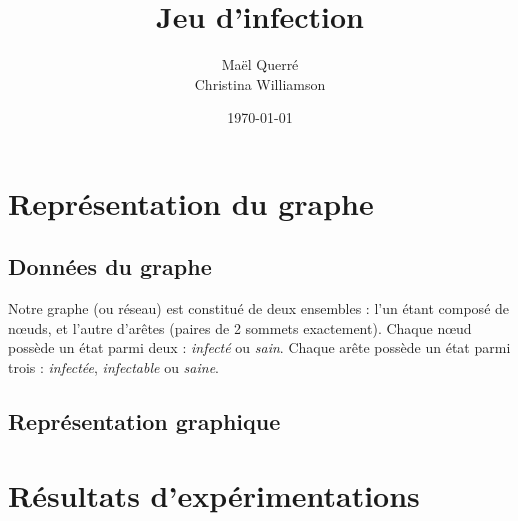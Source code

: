 \documentclass[a4paper, 11pt]{report}
\title{Jeu d'infection}
\date{\today}
\author{Maël Querré\\
        Christina Williamson}
\makeatletter
\def\@university{}
\def\@department{}
\def\@subject{}
\newcommand{\mytitle}{
  \begin{titlepage} %
  \hbox{
    \parbox[b]{.4\textwidth}{ %
      {\noindent\itshape\@university\\ %
      \@department} %
      \vskip.94\textheight %
    }
    \rule{1pt}{\textheight} %
    \hspace*{0.05\textwidth} %
    \parbox[b]{0.75\textwidth}{
      {\noindent\Huge\bfseries\@title} %
      \vskip 5em%
      {\large{\@subject}} %
      \vskip 9em%
      \@author %
      \vskip 0.4\textheight %
      {\noindent\@date}\\[\baselineskip] %
    }
  }
  \end{titlepage}
}
\makeatother
\begin{document}
\mytitle

\tableofcontents

\chapter{Représentation du graphe}

\section{Données du graphe}

Notre graphe (ou réseau) est constitué de deux ensembles : l'un étant composé de n\oe uds, et l'autre d'arêtes (paires de 2 sommets exactement). Chaque n\oe ud possède un état parmi deux : {\it infecté} ou {\it sain}. Chaque arête possède un état parmi trois : {\it infectée}, {\it infectable} ou {\it saine}.

\section{Représentation graphique}


\chapter{Résultats d'expérimentations}
\end{document}
